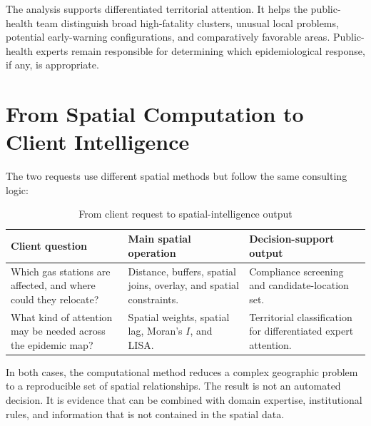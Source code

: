 \documentclass[11pt]{article}
\begin{document}
\begin{decisionbox}
The analysis supports differentiated territorial attention. It helps the public-health team distinguish broad high-fatality clusters, unusual local problems, potential early-warning configurations, and comparatively favorable areas. Public-health experts remain responsible for determining which epidemiological response, if any, is appropriate.
\end{decisionbox}


\section{From Spatial Computation to Client Intelligence}

The two requests use different spatial methods but follow the same consulting logic:

\begin{table}[!htbp]
\centering
\caption{From client request to spatial-intelligence output}
\begin{tabularx}{\textwidth}{>{\raggedright\arraybackslash}p{} >{\raggedright\arraybackslash}p{} X}
\toprule
Client question & Main spatial operation & Decision-support output \\
\midrule

Which gas stations are affected, and where could they relocate? &
Distance, buffers, spatial joins, overlay, and spatial constraints. &
Compliance screening and candidate-location set. \\

What kind of attention may be needed across the epidemic map? &
Spatial weights, spatial lag, Moran's \(I\), and LISA. &
Territorial classification for differentiated expert attention. \\

\bottomrule
\end{tabularx}
\end{table}

In both cases, the computational method reduces a complex geographic problem to a reproducible set of spatial relationships. The result is not an automated decision. It is evidence that can be combined with domain expertise, institutional rules, and information that is not contained in the spatial data.
\end{document}
